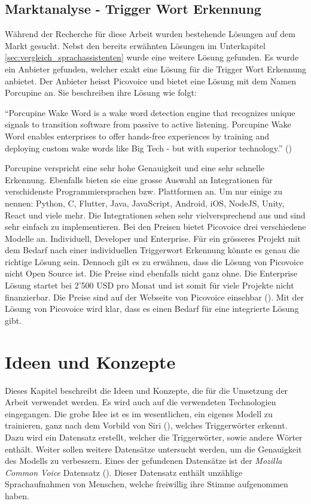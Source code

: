 \documentclass[11pt,a4paper]{article}
\begin{document}
\subsection{Marktanalyse - Trigger Wort Erkennung}
Während der Recherche für diese Arbeit wurden bestehende Lösungen auf dem Markt gesucht. Nebst den 
bereits erwähnten Lösungen im Unterkapitel \ref{sec:vergleich_sprachassistenten} wurde eine weitere Lösung 
gefunden. Es wurde ein Anbieter gefunden, welcher exakt eine Lösung für die Trigger Wort Erkennung 
anbietet. Der Anbieter heisst Picovoice und bietet eine Lösung mit dem Namen Porcupine an. Sie 
beschreiben ihre Lösung wie folgt:

\begin{displayquote}
	``Porcupine Wake Word is a wake word detection engine that recognizes unique signals to
	transition software from passive to active listening. Porcupine Wake Word enables enterprises
	to offer hands-free experiences by training and deploying custom wake words like Big Tech -
	but with superior technology.'' (\cite{picovoice2023porcupine})
\end{displayquote}

\noindent \newline
Porcupine verspricht eine sehr hohe Genauigkeit und eine sehr schnelle Erkennung. Ebenfalls bieten
sie eine grosse Auswahl an Integrationen für verschidenste Programmiersprachen bzw. Plattformen an.
Um nur einige zu nennen: Python, C, Flutter, Java, JavaScript, Android, iOS, NodeJS, Unity, React
und viele mehr. Die Integrationen sehen sehr vielversprechend aus und sind sehr einfach zu
implementieren. Bei den Preisen bietet Picovoice drei verschiedene Modelle an. Individuell,
Developer und Enterprise. Für ein grösseres Projekt mit dem Bedarf nach einer individuellen
Triggerwort Erkennung könnte es genau die richtige Lösung sein. Dennoch gilt es zu erwähnen,
dass die Lösung von Picovoice nicht Open Source ist. Die Preise sind ebenfalls nicht ganz ohne.
Die Enterprise Lösung startet bei 2'500 USD pro Monat und ist somit für viele Projekte nicht
finanzierbar. Die Preise sind auf der Webseite von Picovoice einsehbar
(\cite{picovoice2023porcupine}). Mit der Lösung von Picovoice wird klar, dass es einen Bedarf für 
eine integrierte Lösung gibt.

\newpage \section{Ideen und Konzepte}
Dieses Kapitel beschreibt die Ideen und Konzepte, die für die Umsetzung der Arbeit verwendet
werden. Es wird auch auf die verwendeten Technologien eingegangen. Die grobe Idee ist es im 
wesentlichen, ein eigenes Modell zu trainieren, ganz nach dem Vorbild von Siri (\cite{siri2017hey}), 
welches Triggerwörter erkennt. Dazu wird ein Datensatz erstellt, welcher die Triggerwörter, 
sowie andere Wörter enthält. Weiter sollen weitere Datensätze untersucht werden, um die 
Genauigkeit des Modells zu verbessern. Eines der gefundenen Datensätze ist der 
\textit{Mozilla Common Voice} Datensatz (\cite{ardila2020common}). Dieser Datensatz enthält 
unzählige Sprachaufnahmen von Menschen, welche freiwillig ihre Stimme aufgenommen haben. 
\end{document}
